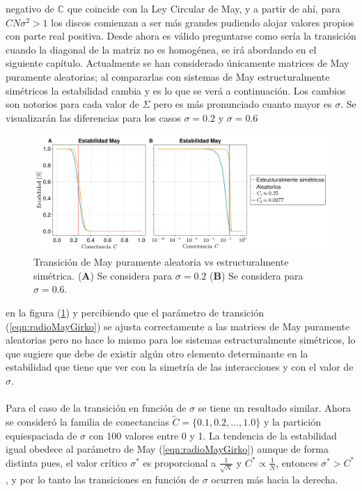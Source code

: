 negativo de $\mathbb{C}$ que coincide con la Ley Circular de May, y a partir de ahí, para $CN\sigma^2>1$ los discos comienzan a ser más grandes pudiendo alojar valores propios con parte real positiva. Desde ahora es válido preguntarse como sería la transición cuando la diagonal de la matriz no es homogénea, se irá abordando en el siguiente capítulo. Actualmente se han considerado únicamente matrices de May puramente aleatorias; al compararlas con sistemas de May estructuralmente simétricos la estabilidad cambia y es lo que se verá a continuación. Los cambios son notorios para cada valor de $\Sigma$ pero es más pronunciado cuanto mayor es $\sigma$. Se visualizarán las diferencias para los casos $\sigma= 0.2$ y $\sigma = 0.6$
\begin{figure}[h!]
	\centering
	\includegraphics[scale = 0.165]{../Imagenes/TransicionDirvsNoDir}
	\caption{Transición de May puramente aleatoria vs estructuralmente simétrica. (\textbf{A}) Se considera para $\sigma = 0.2$ (\textbf{B}) Se considera para $\sigma=0.6$.}
	\label{fig:TransicionDirvsNoDir}
\end{figure}
en la figura (\ref{fig:TransicionDirvsNoDir}) y percibiendo que el parámetro de transición (\ref{eqn:radioMayGirko}) se ajusta correctamente a las matrices de May puramente aleatorias pero no hace lo mismo para los sistemas estructuralmente simétricos, lo que sugiere que debe de existir algún otro elemento determinante en la estabilidad que tiene que ver con la simetría de las interacciones y con el valor de $\sigma$.
\\
\\
Para el caso de la transición en función de $\sigma$ se tiene un resultado similar. Ahora se consideró la familia de conectancias $\tilde{C}=\{0.1,0.2,...,1.0\}$ y la partición equiespaciada de $\sigma$ con 100 valores entre 0 y 1. La tendencia de la estabilidad igual obedece al parámetro de May (\ref{eqn:radioMayGirko}) aunque de forma distinta pues, el valor crítico $\sigma^*$ es proporcional a $\frac{1}{\sqrt{N}}$ y $C^*\propto \frac{1}{N}$, entonces $\sigma^*>C^*$, y por lo tanto las transiciones en función de $\sigma$ ocurren más hacia la derecha. 
